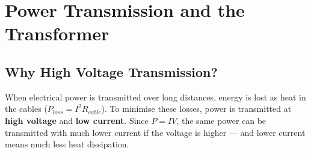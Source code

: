 \section{Power Transmission and the Transformer}

\subsection{Why High Voltage Transmission?}

When electrical power is transmitted over long
distances, energy is lost as heat in the cables
($P_{loss} = I^2R_{cable}$). To minimise these
losses, power is transmitted at \textbf{high voltage}
and \textbf{low current}. Since $P = IV$, the same
power can be transmitted with much lower current
if the voltage is higher --- and lower current means
much less heat dissipation.

